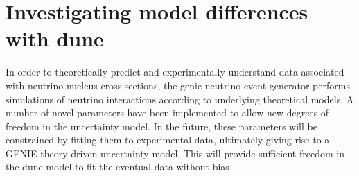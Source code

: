 \section{Investigating model differences with \texorpdfstring{\acrshort{dune}}{TEXT}} \vspace{-3mm} \label{dune_measurement}
%
In order to theoretically predict and experimentally understand data associated with neutrino-nucleus cross sections, the \acrshort{genie} neutrino event generator performs simulations of neutrino interactions according to underlying theoretical models. A number of novel parameters have been implemented to allow new degrees of freedom in the uncertainty model. In the future, these parameters will be constrained by fitting them to experimental data, ultimately giving rise to a GENIE theory-driven uncertainty model. %
This will provide sufficient freedom in the \acrshort{dune} model to fit the eventual data without bias \cite{PhysRevD.105.072001}.

\vspace{-3mm}
